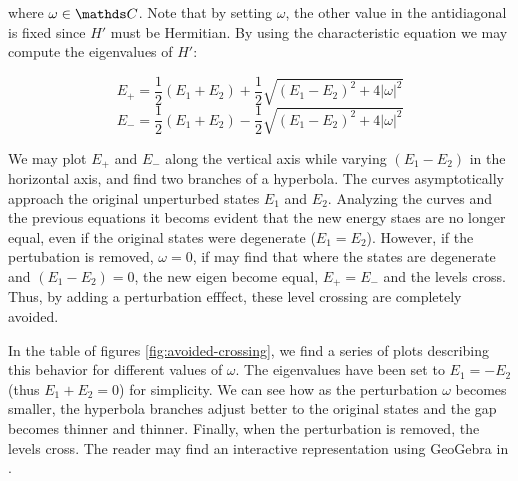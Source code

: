 where $\omega \in \C$. Note that by setting $\omega$, the other value in the antidiagonal is fixed since $H'$ must be Hermitian. By using the characteristic equation we may compute the eigenvalues of $H'$:

$$ E_+ = \frac{1}{2}(E_1 + E_2) + \frac{1}{2}\sqrt{(E_1 - E_2)^2 + 4|\omega|^2} $$
$$ E_- = \frac{1}{2}(E_1 + E_2) - \frac{1}{2}\sqrt{(E_1 - E_2)^2 + 4|\omega|^2} $$

We may plot $E_+$ and $E_-$ along the vertical axis while varying $(E_1 - E_2)$ in the horizontal axis, and find two branches of a hyperbola. The curves asymptotically approach the original unperturbed states $E_1$ and $E_2$. Analyzing the curves and the previous equations it becoms evident that the new energy staes are no longer equal, even if the original states were degenerate ($E_1 = E_2$). However, if the pertubation is removed, $\omega = 0$, if may find that where the states are degenerate and $(E_1 - E_2) = 0$, the new eigen become equal, $E_+ = E_-$ and the levels cross. Thus, by adding a perturbation efffect, these level crossing are completely avoided.

In the table of figures \ref{fig:avoided-crossing}, we find a series of plots describing this behavior for different values of $\omega$. The eigenvalues have been set to $E_1 = -E_2$ (thus $E_1 + E_2 = 0$) for simplicity. We can see how as the perturbation $\omega$ becomes smaller, the hyperbola branches adjust better to the original states and the gap becomes thinner and thinner. Finally, when the perturbation is removed, the levels cross. The reader may find an interactive representation using GeoGebra in \cite{GeoGebra-AvoidedCrossing}.

\begin{table}[H]
	\centering
	\caption{Avoided crossing in two-state system \cite{GeoGebra-AvoidedCrossing}. By increasing the perturbation $\omega$, the energy level crossing is avoided. }
	\label{fig:avoided-crossing}
\end{table}

